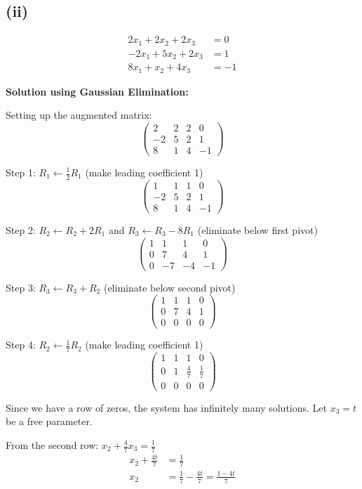 \subsection*{(ii)}
\begin{align*}
2x_1 + 2x_2 + 2x_3 &= 0\\
-2x_1 + 5x_2 + 2x_3 &= 1\\
8x_1 + x_2 + 4x_3 &= -1
\end{align*}

\textbf{Solution using Gaussian Elimination:}

Setting up the augmented matrix:
\[
\left(\begin{array}{ccc|c}
2 & 2 & 2 & 0\\
-2 & 5 & 2 & 1\\
8 & 1 & 4 & -1
\end{array}\right)
\]

Step 1: $R_1 \leftarrow \frac{1}{2}R_1$ (make leading coefficient 1)
\[
\left(\begin{array}{ccc|c}
1 & 1 & 1 & 0\\
-2 & 5 & 2 & 1\\
8 & 1 & 4 & -1
\end{array}\right)
\]

Step 2: $R_2 \leftarrow R_2 + 2R_1$ and $R_3 \leftarrow R_3 - 8R_1$ (eliminate below first pivot)
\[
\left(\begin{array}{ccc|c}
1 & 1 & 1 & 0\\
0 & 7 & 4 & 1\\
0 & -7 & -4 & -1
\end{array}\right)
\]

Step 3: $R_3 \leftarrow R_3 + R_2$ (eliminate below second pivot)
\[
\left(\begin{array}{ccc|c}
1 & 1 & 1 & 0\\
0 & 7 & 4 & 1\\
0 & 0 & 0 & 0
\end{array}\right)
\]

Step 4: $R_2 \leftarrow \frac{1}{7}R_2$ (make leading coefficient 1)
\[
\left(\begin{array}{ccc|c}
1 & 1 & 1 & 0\\
0 & 1 & \frac{4}{7} & \frac{1}{7}\\
0 & 0 & 0 & 0
\end{array}\right)
\]

Since we have a row of zeros, the system has infinitely many solutions. Let $x_3 = t$ be a free parameter.

From the second row: $x_2 + \frac{4}{7}x_3 = \frac{1}{7}$
\begin{align*}
x_2 + \frac{4t}{7} &= \frac{1}{7}\\
x_2 &= \frac{1}{7} - \frac{4t}{7} = \frac{1-4t}{7}
\end{align*}

